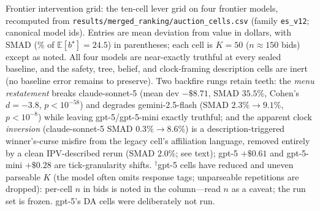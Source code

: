 \begin{table}[htbp]
\caption{Frontier intervention grid: the ten-cell lever grid on four frontier models, recomputed from \texttt{results/merged\_ranking/auction\_cells.csv} (family \texttt{es\_v12}; canonical model ids). Entries are mean deviation from value in dollars, with SMAD (\% of $\mathbb{E}[b^\star]=24.5$) in parentheses; each cell is $K=50$ ($n\approx 150$ bids) except as noted. All four models are near-exactly truthful at every sealed baseline, and the safety, tree, belief, and clock-framing description cells are inert (no baseline error remains to preserve). Two backfire rungs retain teeth: the \emph{menu restatement} breaks claude-sonnet-5 (mean dev $-\$8.71$, SMAD $35.5\%$, Cohen's $d=-3.8$, $p<10^{-58}$) and degrades gemini-2.5-flash (SMAD $2.3\%\!\to\!9.1\%$, $p<10^{-8}$) while leaving gpt-5/gpt-5-mini exactly truthful; and the apparent clock \emph{inversion} (claude-sonnet-5 SMAD $0.3\%\!\to\!8.6\%$) is a description-triggered winner's-curse misfire from the legacy cell's affiliation language, removed entirely by a clean IPV-described rerun (SMAD $2.0\%$; see text); gpt-5 $+\$0.61$ and gpt-5-mini $+\$0.28$ are tick-granularity shifts. $^{\dagger}$gpt-5 cells have reduced and uneven parseable $K$ (the model often omits response tags; unparseable repetitions are dropped): per-cell $n$ in bids is noted in the column---read $n$ as a caveat; the run set is frozen. gpt-5's DA cells were deliberately not run.}
\label{tab:frontier-grid}
\end{table}

